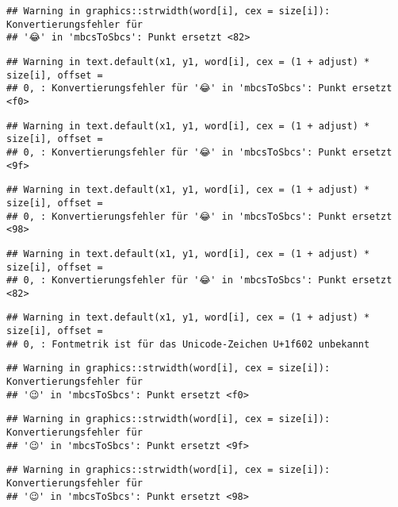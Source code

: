 \documentclass[
]{book}
\begin{document}
\begin{verbatim}
## Warning in graphics::strwidth(word[i], cex = size[i]): Konvertierungsfehler für
## '😂' in 'mbcsToSbcs': Punkt ersetzt <82>
\end{verbatim}

\begin{verbatim}
## Warning in text.default(x1, y1, word[i], cex = (1 + adjust) * size[i], offset =
## 0, : Konvertierungsfehler für '😂' in 'mbcsToSbcs': Punkt ersetzt <f0>
\end{verbatim}

\begin{verbatim}
## Warning in text.default(x1, y1, word[i], cex = (1 + adjust) * size[i], offset =
## 0, : Konvertierungsfehler für '😂' in 'mbcsToSbcs': Punkt ersetzt <9f>
\end{verbatim}

\begin{verbatim}
## Warning in text.default(x1, y1, word[i], cex = (1 + adjust) * size[i], offset =
## 0, : Konvertierungsfehler für '😂' in 'mbcsToSbcs': Punkt ersetzt <98>
\end{verbatim}

\begin{verbatim}
## Warning in text.default(x1, y1, word[i], cex = (1 + adjust) * size[i], offset =
## 0, : Konvertierungsfehler für '😂' in 'mbcsToSbcs': Punkt ersetzt <82>
\end{verbatim}

\begin{verbatim}
## Warning in text.default(x1, y1, word[i], cex = (1 + adjust) * size[i], offset =
## 0, : Fontmetrik ist für das Unicode-Zeichen U+1f602 unbekannt
\end{verbatim}

\begin{verbatim}
## Warning in graphics::strwidth(word[i], cex = size[i]): Konvertierungsfehler für
## '😉' in 'mbcsToSbcs': Punkt ersetzt <f0>
\end{verbatim}

\begin{verbatim}
## Warning in graphics::strwidth(word[i], cex = size[i]): Konvertierungsfehler für
## '😉' in 'mbcsToSbcs': Punkt ersetzt <9f>
\end{verbatim}

\begin{verbatim}
## Warning in graphics::strwidth(word[i], cex = size[i]): Konvertierungsfehler für
## '😉' in 'mbcsToSbcs': Punkt ersetzt <98>
\end{verbatim}
\end{document}
